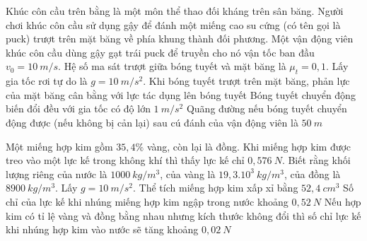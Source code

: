 \begin{ex}%
Khúc côn cầu trên bằng là một môn thể thao đối kháng trên sân băng. Người chơi khúc côn cầu sử dụng gậy để đánh một miếng cao su cứng (có tên gọi là puck) trượt trên mặt băng về phía khung thành đối phương. Một vận động viên khúc côn cầu dùng gậy gạt trái puck để truyền cho nó vận tốc ban đầu $v_0 = 10\ m/s$. Hệ số ma sát trượt giữa bóng tuyết và mặt băng là $\mu_t = 0,1$. Lấy gia tốc rơi tự do là $g = 10\ m/s^2$.
{\True Khi bóng tuyết trượt trên mặt băng, phản lực của mặt băng cân bằng với lực tác dụng lên bóng tuyết}
{\True Bóng tuyết chuyển động biến đổi đều với gia tốc có độ lớn $1\ m/s^2$}
{\True Quãng đường nếu bóng tuyết chuyển động được (nếu không bị cản lại) sau cú đánh của vận động viên là $50\ m$}
\loigiai{
\begin{itemchoice}
\itemch
\itemch
\itemch
\itemch
\end{itemchoice}}
 \end{ex}
\begin{ex}%
Một miếng hợp kim gồm $35,4 \%$ vàng, còn lại là đồng. Khi miếng hợp kim được treo vào một lực kế trong không khí thì thấy lực kế chỉ $0,576 \ N$. Biết rằng khối lượng riêng của nước là $1000 \ kg / m^3$, của vàng là $19,3.10^3 \ kg / m^3$, của đồng là $8900 \ kg / m^3$. Lấy $g=10 \ m/s^2$.
{Thể tích miếng hợp kim xấp xỉ bằng $52,4 \ cm^3$} 
{\True Số chỉ của lực kế khi nhúng miếng hợp kim ngập trong nước khoảng $0,52\ N$} 
{Nếu hợp kim có tỉ lệ vàng và đồng bằng nhau nhưng kích thước không đổi thì số chỉ lực kế khi nhúng hợp kim vào nước sẽ tăng khoảng $0,02 \ N$} 
\loigiai{ 
\begin{itemchoice}
\itemch
\itemch
\itemch
\itemch
\end{itemchoice}
}
\end{ex}




















